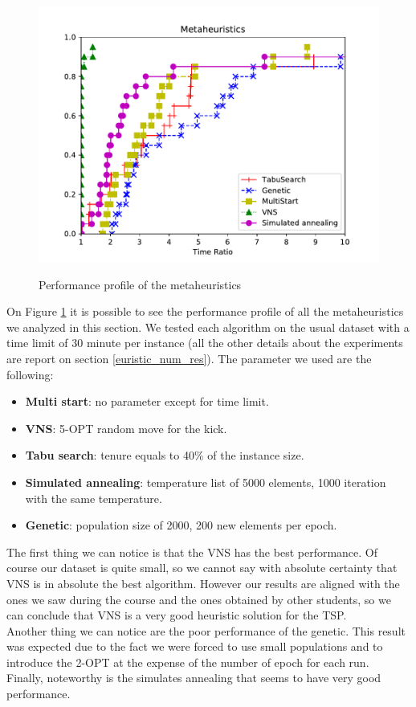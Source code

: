 \begin{figure}[h!]
\centering
	\includegraphics[scale=0.9]{media/metaheuristics.pdf} \\
	\caption{Performance profile of the metaheuristics}
	\label{fig:metaheuristics}
\end{figure}

On Figure \ref{fig:metaheuristics} it is possible to see the performance profile of all the metaheuristics we analyzed in this section. We tested each algorithm on the usual dataset with a time limit of 30 minute per instance (all the other details about the experiments are report on section \ref{euristic_num_res}). The parameter we used are the following:

\begin{itemize}
	\item \textbf{Multi start}: no parameter except for time limit.
	\item \textbf{VNS}: 5-OPT random move for the kick.
	\item \textbf{Tabu search}: tenure equals to 40\% of the instance size.
	\item \textbf{Simulated annealing}: temperature list of 5000 elements, 1000 iteration with the same temperature.
	\item \textbf{Genetic}: population size of 2000, 200 new elements per epoch. 
\end{itemize}

\noindent The first thing we can notice is that the VNS has the best performance. Of course our dataset is quite small, so we cannot say with absolute certainty that VNS is in absolute the best algorithm. However our results are aligned with the ones we saw during the course and the ones obtained by other students, so we can conclude that VNS is a very good heuristic solution for the TSP. \\
Another thing we can notice are the poor performance of the genetic. This result was expected due to the fact we were forced to use small populations and to introduce the 2-OPT at the expense of the number of epoch for each run. \\
Finally, noteworthy is the simulates annealing that seems to have very good performance.
